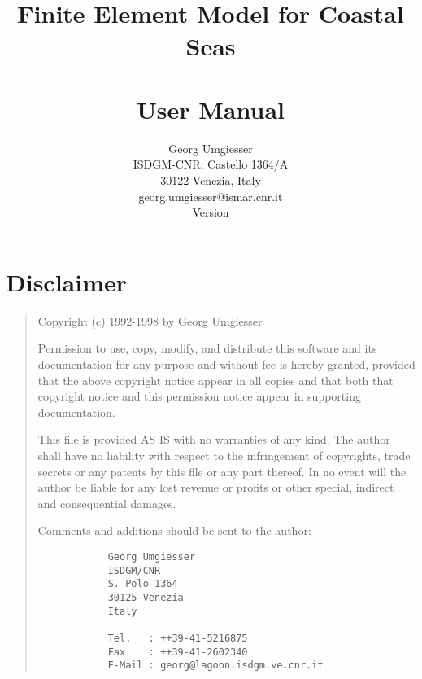 \documentclass{report}
\title{%
	\shy{} 
	\\Finite Element Model for Coastal Seas
	\\~
	\\User Manual
	}
\author{%
	Georg Umgiesser
	\\ISDGM-CNR, Castello 1364/A
	\\30122 Venezia, Italy
	\vspace{0.5cm}
	\\georg.umgiesser@ismar.cnr.it
	\vspace{1cm}
	\\Version \VERSION
	}
\begin{document}


\pagestyle{plain}

\maketitle

%

\thispagestyle{empty}

\newpage

\tableofcontents

\newpage





\chapter*{Disclaimer}


\begin{quotation}
  									 
   Copyright (c) 1992-1998 by Georg Umgiesser				 
  									 
   Permission to use, copy, modify, and distribute this software	 
   and its documentation for any purpose and without fee is hereby	 
   granted, provided that the above copyright notice appear in all	 
   copies and that both that copyright notice and this permission	 
   notice appear in supporting documentation.				 
  									 
   This file is provided AS IS with no warranties of any kind.		 
   The author shall have no liability with respect to the		 
   infringement of copyrights, trade secrets or any patents by		 
   this file or any part thereof.  In no event will the author		 
   be liable for any lost revenue or profits or other special,		 
   indirect and consequential damages.					 
  									 
   Comments and additions should be sent to the author:			 
  									 
	\begin{verbatim}
  			Georg Umgiesser					 
  			ISDGM/CNR					 
  			S. Polo 1364					 
  			30125 Venezia					 
  			Italy						 
  									 
  			Tel.   : ++39-41-5216875			 
  			Fax    : ++39-41-2602340			 
  			E-Mail : georg@lagoon.isdgm.ve.cnr.it		 
	\end{verbatim}
\end{quotation}
\end{document}
